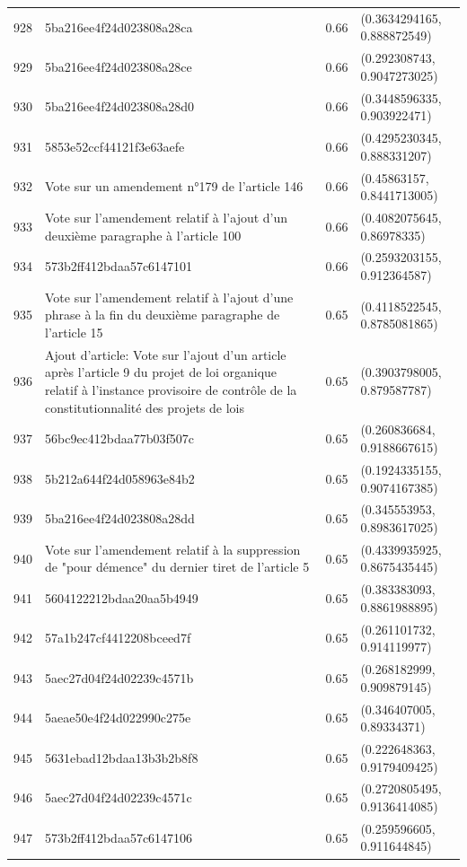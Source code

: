 \begin{table}[ht]
\begin{tabular}{rlrl}
  928 & 5ba216ee4f24d023808a28ca & 0.66 & (0.3634294165, 0.888872549) \\ 
  929 & 5ba216ee4f24d023808a28ce & 0.66 & (0.292308743, 0.9047273025) \\ 
  930 & 5ba216ee4f24d023808a28d0 & 0.66 & (0.3448596335, 0.903922471) \\ 
  931 & 5853e52ccf44121f3e63aefe & 0.66 & (0.4295230345, 0.888331207) \\ 
  932 & Vote sur un amendement n°179 de l'article 146 & 0.66 & (0.45863157, 0.8441713005) \\ 
  933 & Vote sur l'amendement relatif à l'ajout d'un deuxième paragraphe à l'article 100 & 0.66 & (0.4082075645, 0.86978335) \\ 
  934 & 573b2ff412bdaa57c6147101 & 0.66 & (0.2593203155, 0.912364587) \\ 
  935 & Vote sur l'amendement relatif à l'ajout d'une phrase à la fin du deuxième paragraphe de l'article 15 & 0.65 & (0.4118522545, 0.8785081865) \\ 
  936 & Ajout d'article: Vote sur l'ajout d'un article après l'article 9 du projet de loi organique relatif à l'instance provisoire de contrôle de la constitutionnalité des projets de lois & 0.65 & (0.3903798005, 0.879587787) \\ 
  937 & 56bc9ec412bdaa77b03f507c & 0.65 & (0.260836684, 0.9188667615) \\ 
  938 & 5b212a644f24d058963e84b2 & 0.65 & (0.1924335155, 0.9074167385) \\ 
  939 & 5ba216ee4f24d023808a28dd & 0.65 & (0.345553953, 0.8983617025) \\ 
  940 & Vote sur l'amendement relatif à la suppression de "pour démence" du dernier tiret de l'article 5 & 0.65 & (0.4339935925, 0.8675435445) \\ 
  941 & 5604122212bdaa20aa5b4949 & 0.65 & (0.383383093, 0.8861988895) \\ 
  942 & 57a1b247cf4412208bceed7f & 0.65 & (0.261101732, 0.914119977) \\ 
  943 & 5aec27d04f24d02239c4571b & 0.65 & (0.268182999, 0.909879145) \\ 
  944 & 5aeae50e4f24d022990c275e & 0.65 & (0.346407005, 0.89334371) \\ 
  945 & 5631ebad12bdaa13b3b2b8f8 & 0.65 & (0.222648363, 0.9179409425) \\ 
  946 & 5aec27d04f24d02239c4571c & 0.65 & (0.2720805495, 0.9136414085) \\ 
  947 & 573b2ff412bdaa57c6147106 & 0.65 & (0.259596605, 0.911644845) \\ 

\end{tabular}
\end{table}
